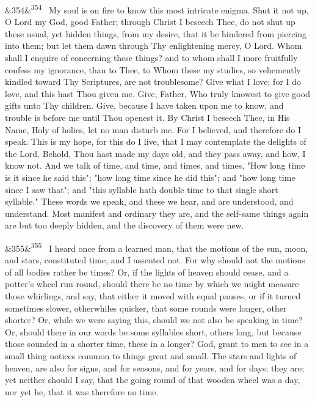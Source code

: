 \documentclass[12pt]{article}
\newcommand{\para}[1][]{\par\noindent\ifx&#1&\else\textsuperscript{\footnotesize #1}~\fi}
\begin{document}
\para[354] My soul is on fire to know this most intricate enigma. Shut it not up, O Lord my God, good Father; through Christ I beseech Thee, do not shut up these usual, yet hidden things, from my desire, that it be hindered from piercing into them; but let them dawn through Thy enlightening mercy, O Lord. Whom shall I enquire of concerning these things? and to whom shall I more fruitfully confess my ignorance, than to Thee, to Whom these my studies, so vehemently kindled toward Thy Scriptures, are not troublesome? Give what I love; for I do love, and this hast Thou given me. Give, Father, Who truly knowest to give good gifts unto Thy children. Give, because I have taken upon me to know, and trouble is before me until Thou openest it. By Christ I beseech Thee, in His Name, Holy of holies, let no man disturb me. For I believed, and therefore do I speak. This is my hope, for this do I live, that I may contemplate the delights of the Lord. Behold, Thou hast made my days old, and they pass away, and how, I know not. And we talk of time, and time, and times, and times, "How long time is it since he said this"; "how long time since he did this"; and "how long time since I saw that"; and "this syllable hath double time to that single short syllable." These words we speak, and these we hear, and are understood, and understand. Most manifest and ordinary they are, and the self-same things again are but too deeply hidden, and the discovery of them were new.

\para[355] I heard once from a learned man, that the motions of the sun, moon, and stars, constituted time, and I assented not. For why should not the motions of all bodies rather be times? Or, if the lights of heaven should cease, and a potter's wheel run round, should there be no time by which we might measure those whirlings, and say, that either it moved with equal pauses, or if it turned sometimes slower, otherwhiles quicker, that some rounds were longer, other shorter? Or, while we were saying this, should we not also be speaking in time? Or, should there in our words be some syllables short, others long, but because those sounded in a shorter time, these in a longer? God, grant to men to see in a small thing notices common to things great and small. The stars and lights of heaven, are also for signs, and for seasons, and for years, and for days; they are; yet neither should I say, that the going round of that wooden wheel was a day, nor yet he, that it was therefore no time.
\end{document}
